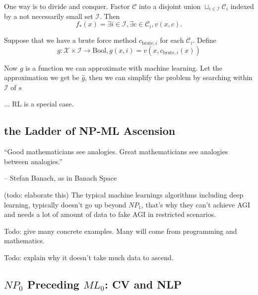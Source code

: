 \documentclass[../main.tex]{subfiles}
\begin{document}
One way is to divide and conquer. Factor $\mathcal{C}$ into a disjoint union $\sqcup_{i\in \mathcal{I}} \mathcal{C}_{i}$ indexed by a not necessarily small set $\mathcal{I}$. Then
\begin{equation}
	f_*(x)=\exists i\in \mathcal{I}, \exists c\in \mathcal{C}_i, v(x,c).
\end{equation}

Suppose that we have a brute force method $c_{\text{brute},i}$ for each $\mathcal{C}_i$. Define
\begin{equation}
	g: \mathcal{X}\times \mathcal{I} \rightarrow \text{Bool}, g(x, i) = v(x, c_{\text{brute},i}(x))
\end{equation}

Now $g$ is a function we can approximate with machine learning. Let the approximation we get be $\hat{g}$, then we can simplify the problem by searching within $\mathcal{I}$ of $s$

... RL is a special case.

\subsection{the Ladder of NP-ML Ascension}
``Good mathematicians see analogies. Great mathematicians see analogies between analogies.''

\hfill -- Stefan Banach, as in Banach Space


\begin{center}
\end{center}

(todo: elaborate this)
The typical machine learnings algorithms including deep learning, typically doesn't go up beyond $NP_1$, that's why they can't achieve AGI and needs a lot of amount of data to fake AGI in restricted scenarios.

Todo: give many concrete examples. Many will come from programming and mathematics.

Todo: explain why it doesn't take much data to ascend.

\subsection{$NP_0$ Preceding $ML_0$: CV and NLP}
\end{document}
